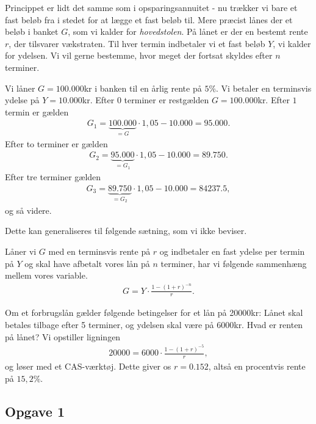 Princippet er lidt det samme som i opsparingsannuitet - nu trækker vi bare et fast beløb fra i stedet for at lægge et fast beløb til. Mere præcist lånes der et beløb i banket $G$, som vi kalder for \textit{hovedstolen}. På lånet er der en bestemt rente $r$, der tilsvarer vækstraten. Til hver termin indbetaler vi et fast beløb $Y$, vi kalder for ydelsen. Vi vil gerne bestemme, hvor meget der fortsat skyldes efter $n$ terminer. 
\begin{exa}
Vi låner $G=100.000$kr i banken til en årlig rente på $5\%$. Vi betaler en terminsvis ydelse på $Y=10.000$kr.
Efter $0$ terminer er restgælden $G=100.000$kr. Efter $1$ termin er gælden
\begin{align*}
G_1 = \underbrace{100.000}_{=G}\cdot 1,05 - 10.000 = 95.000.
\end{align*}   
Efter to terminer er gælden 
\begin{align*}
G_2 = \underbrace{95.000}_{=G_1}\cdot 1,05-10.000 = 89.750.
\end{align*}
Efter tre terminer gælden 
\begin{align*}
G_3 = \underbrace{89.750}_{=G_2} \cdot 1,05 - 10.000 = 84237.5,
\end{align*}
og så videre. 
\end{exa}
Dette kan generaliseres til følgende sætning, som vi ikke beviser.
\begin{setn}
	Låner vi $G$ med en terminsvis rente på $r$ og indbetaler en fast ydelse per termin på $Y$ og skal have afbetalt vores lån på $n$ terminer, har vi følgende sammenhæng
	mellem vores variable.
	\begin{align*}
		G = Y\cdot \frac{1-(1+r)^{-n}}{r}.
	\end{align*}
\end{setn}
\begin{exa}
	Om et forbrugslån gælder følgende betingelser for et lån på 20000kr: Lånet skal betales tilbage efter 5 terminer, og ydelsen skal være på 6000kr. Hvad er renten på lånet?
	Vi opstiller ligningen
	\begin{align*}
		20000 = 6000\cdot \frac{1-(1+r)^{-5}}{r},
	\end{align*}
	og løser med et CAS-værktøj. Dette giver os $r = 0.152$, altså en procentvis rente på $15,2\%$.
\end{exa}

\subsection*{Opgave 1}

